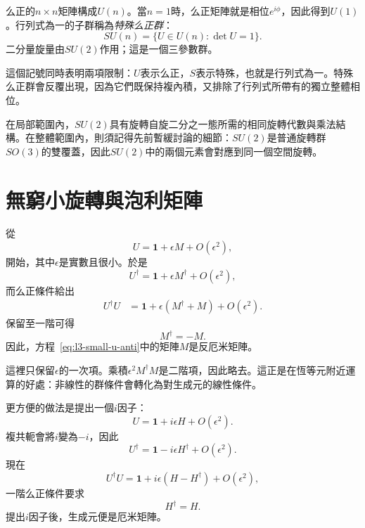 么正的\(n\times n\)矩陣構成\(U(n)\)。當\(n=1\)時，么正矩陣就是相位\(e^{i\phi}\)，因此得到\(U(1)\)。行列式為一的子群稱為\emph{特殊么正群}：
\begin{equation}
SU(n)=\{U\in U(n):\det U=1\}.
\end{equation}
二分量旋量由\(SU(2)\)作用；這是一個三參數群。

這個記號同時表明兩項限制：\(U\)表示么正，\(S\)表示特殊，也就是行列式為一。特殊么正群會反覆出現，因為它們既保持複內積，又排除了行列式所帶有的獨立整體相位。

在局部範圍內，\(SU(2)\)具有旋轉自旋二分之一態所需的相同旋轉代數與乘法結構。在整體範圍內，則須記得先前暫緩討論的細節：\(SU(2)\)是普通旋轉群\(SO(3)\)的雙覆蓋，因此\(SU(2)\)中的兩個元素會對應到同一個空間旋轉。

\section{無窮小旋轉與泡利矩陣}

\begin{classroomqa}
\end{classroomqa}

從
\begin{equation}
U=\boldsymbol 1+\epsilon M+O(\epsilon^2),
\label{eq:l3-small-u-anti}
\end{equation}
開始，其中\(\epsilon\)是實數且很小。於是
\begin{equation}
U^\dagger=\boldsymbol 1+\epsilon M^\dagger+O(\epsilon^2),
\end{equation}
而么正條件給出
\begin{align}
U^\dagger U
 &=\boldsymbol 1+\epsilon(M^\dagger+M)+O(\epsilon^2).
\end{align}
保留至一階可得
\begin{equation}
M^\dagger=-M.
\end{equation}
因此，方程~\eqref{eq:l3-small-u-anti}中的矩陣\(M\)是反厄米矩陣。

這裡只保留\(\epsilon\)的一次項。乘積\(\epsilon^2M^\dagger M\)是二階項，因此略去。這正是在恆等元附近運算的好處：非線性的群條件會轉化為對生成元的線性條件。

更方便的做法是提出一個\(i\)因子：
\begin{equation}
U=\boldsymbol 1+i\epsilon H+O(\epsilon^2).
\label{eq:l3-small-u-herm}
\end{equation}
複共軛會將\(i\)變為\(-i\)，因此
\begin{equation}
U^\dagger=\boldsymbol 1-i\epsilon H^\dagger+O(\epsilon^2).
\end{equation}
現在
\begin{equation}
U^\dagger U
=\boldsymbol 1+i\epsilon(H-H^\dagger)+O(\epsilon^2),
\end{equation}
一階么正條件要求
\begin{equation}
H^\dagger=H.
\end{equation}
提出\(i\)因子後，生成元便是厄米矩陣。

